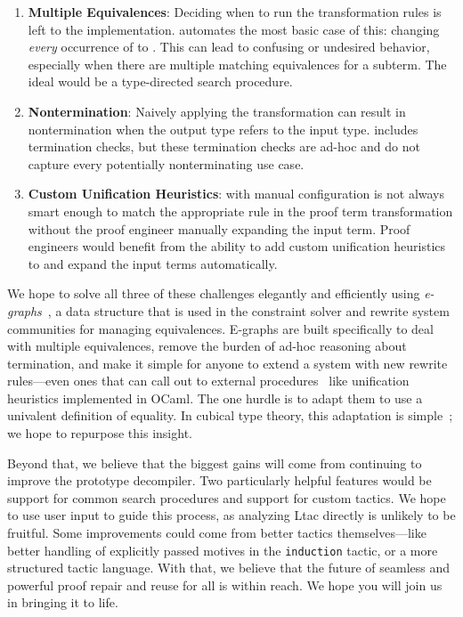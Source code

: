 \begin{enumerate}
\item \textbf{Multiple Equivalences}: Deciding when to run the transformation rules is left to the implementation.
\toolname automates the most basic case of this: changing \textit{every} occurrence of \A to \B.
This can lead to confusing or undesired behavior, especially when there are multiple matching equivalences for a subterm.
The ideal would be a type-directed search procedure.
\item \textbf{Nontermination}: Naively applying the transformation can result in nontermination when the output type refers to the input type.
\toolname includes termination checks, but these termination checks are ad-hoc and do not capture every potentially nonterminating use case.
\item \textbf{Custom Unification Heuristics}: \toolname with manual configuration is not always smart enough to match the appropriate rule in the proof term
transformation without the proof engineer manually expanding the input term.
Proof engineers would benefit from the ability to add custom unification heuristics to \toolname
and expand the input terms automatically.
\end{enumerate}
We hope to solve all three of these challenges elegantly and efficiently using \textit{e-graphs}~\cite{egraph1},
a data structure that is used in the constraint solver and rewrite system communities for managing equivalences.
E-graphs are built specifically to deal with multiple equivalences,
remove the burden of ad-hoc reasoning about termination,
and make it simple for anyone to extend a system with new
rewrite rules---even ones that can call out to external procedures~\cite{egraph5} 
like unification heuristics implemented in OCaml.
The one hurdle is to adapt them to use a univalent definition of equality.
In cubical type theory, this adaptation is simple~\cite{egraph6}; we hope to repurpose this insight.

Beyond that, we believe that the biggest gains will come from continuing to improve the prototype decompiler.
Two particularly helpful features would be support for common search procedures and support for custom tactics.
We hope to use user input to guide this process, as analyzing Ltac directly is unlikely to be fruitful.
Some improvements could come from better tactics themselves---like better handling of explicitly passed 
motives in the \lstinline{induction} tactic, or a more structured tactic language.
With that, we believe that the future of seamless and powerful proof repair and reuse for all is within reach.
We hope you will join us in bringing it to life.




